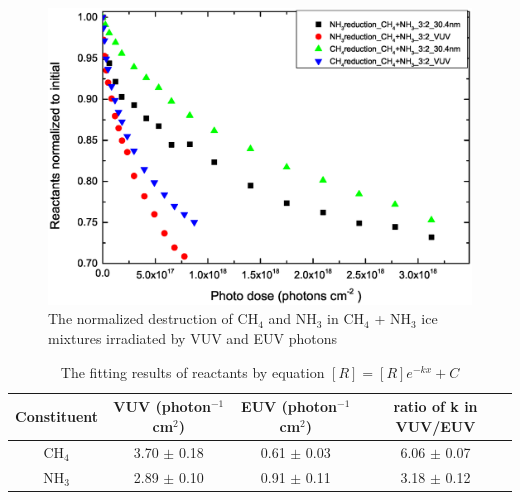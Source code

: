 \begin{figure}
\centering
\includegraphics[width=\textwidth]{figures/chapter3/Reactants_normalized_to_initial.eps}
\caption{The normalized destruction of CH$_4$ and NH$_3$ in CH$_4$ + NH$_3$ ice mixtures irradiated by VUV and EUV photons}
\label{fig:normalized_reactants}
\end{figure}

\begin{table}[htbp]
\caption{The fitting results of reactants by equation $[R]=[R]e^{-kx}+C$}
\label{tab:reactants}
\begin{tabular}{cccc}
\hline
\hline
Constituent & VUV (photon$^{-1}$cm$^2$) & EUV (photon$^{-1}$cm$^2$) & ratio of k in VUV/EUV\\
\hline
CH$_4$ & 3.70 $\pm$ 0.18 & 0.61 $\pm$ 0.03 & 6.06 $\pm$ 0.07\\
NH$_3$ & 2.89 $\pm$ 0.10 & 0.91 $\pm$ 0.11 & 3.18 $\pm$ 0.12\\
\hline
\end{tabular}
\end{table}

